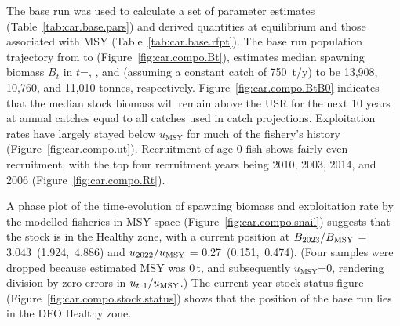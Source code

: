 \documentclass[11pt]{book}
\newcommand{\Bmsy}{B_\text{MSY}}
\newcommand{\umsy}{u_\text{MSY}}
\def\minus{%
  \setbox0=\hbox{-}%
  \vcenter{%
    \hrule width\wd0 height 0.05pt%
  }%
}
\begin{document}


The base run was used to calculate a set of parameter estimates (Table~\ref{tab:car.base.pars}) and derived quantities at equilibrium and those associated with MSY (Table~\ref{tab:car.base.rfpt}).
The base run population trajectory from \startYear{} to \currYear{} (Figure~\ref{fig:car.compo.Bt}), estimates median spawning biomass $B_t$ in $t$=\startYear, \currYear, and \projYear{} (assuming a constant catch of 750~t/y) to be 13,908, 10,760, and 11,010 tonnes, respectively.
Figure~\ref{fig:car.compo.BtB0} indicates that the median stock biomass will remain above the USR for the next 10 years at annual catches equal to all catches used in catch projections.
Exploitation rates have largely stayed below $\umsy$ for much of the fishery's history (Figure~\ref{fig:car.compo.ut}).
Recruitment of age-0 fish shows fairly even recruitment, with the top four recruitment years being
2010, 2003, 2014, and 2006 (Figure~\ref{fig:car.compo.Rt}).

A phase plot of the time-evolution of spawning biomass and exploitation rate by the modelled fisheries in MSY space (Figure~\ref{fig:car.compo.snail}) suggests that the stock is in the Healthy zone, with a current position at $B_{\currYear}/\Bmsy$ = 3.043~(1.924,~4.886)
and $u_{\prevYear}/\umsy$ = 0.27~(0.151,~0.474).
(Four samples were dropped because estimated MSY was 0\,t, and subsequently $\umsy$=0, rendering division by zero errors in $u_{t\minus1}/\umsy$.)
The current-year stock status figure (Figure~\ref{fig:car.compo.stock.status}) shows that the position of the base run lies in the DFO Healthy zone.
\end{document}
